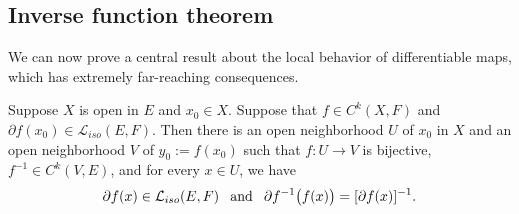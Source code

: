 \subsection{Inverse function theorem}
We can now prove a central result about the local behavior of differentiable maps, which has extremely far-reaching consequences.
\begin{theorem}\label{inverse function}
Suppose $X$ is open in $E$ and $x_0\in X$. Suppose that $f\in C^k(X,F)$ and $\partial f(x_0)\in\mathcal{L}_{iso}(E,F)$. Then there is an open neighborhood $U$ of $x_0$ in $X$ and an open neighborhood $V$ of $y_0:=f(x_0)$ such that $f:U\to V$ is bijective, $f^{-1}\in C^k(V,E)$, and for every $x\in U$, we have
\[\partial f(x)\in\mathcal{L}_{iso}(E,F)\hspace{8pt}\text{and}\hspace{8pt}\partial f^{-1}\big(f(x)\big)=[\partial f(x)]^{-1}.\]
\end{theorem}
